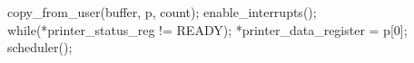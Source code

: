\documentclass[varwidth=19em,crop]{standalone}
\begin{document}
\begin{ccode}
copy_from_user(buffer, p, count);
enable_interrupts();
while(*printer_status_reg != READY);
*printer_data_register = p[0];
scheduler();
\end{ccode}
\end{document}

